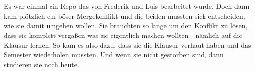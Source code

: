 


\chapter{\chapterTwo}
Es war einmal ein Repo das von Frederik und Luis bearbeitet wurde.
Doch dann kam plötzlich ein böser Mergekonflikt und die beiden mussten sich entscheiden, wie sie damit umgehen wollen.
Sie brauchten so lange um den Konflikt zu lösen, dass sie komplett vergaßen was sie eigentlich machen wollten - nämlich auf die Klausur lernen.
So kam es also dazu, dass sie die Klausur verhaut haben und das Semester wiederholen mussten.
Und wenn sie nicht gestorben sind, dann studieren sie noch heute.

